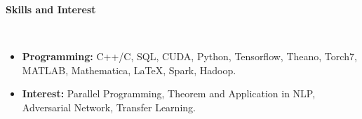 \documentclass[a4paper,11pt]{article}
\makeatletter
\newcommand{\resheading}[1]{{\large \colorbox{mygrey}{\begin{minipage}{\textwidth}{\textbf{#1 \vphantom{p\^{E}}}}\end{minipage}}}}
\newcommand{\ressubheading}[4]{
	\begin{tabular*}{6.5in}{l@{\extracolsep{\fill}}r}
		\textbf{#1} & #2 \\
		\textit{#3} & \textit{#4} \\
	\end{tabular*}\vspace{-6pt}}
\makeatother
\begin{document}
		\resheading{Skills and Interest}\\
		\begin{itemize}
			\item \textbf{Programming:} C++/C, SQL, CUDA, Python, Tensorflow, Theano, Torch7, MATLAB, Mathematica, \LaTeX, Spark, Hadoop.
			\item \textbf{Interest:} Parallel Programming, Theorem and Application in NLP, Adversarial Network, Transfer Learning.
		\end{itemize}
		
\end{document}
